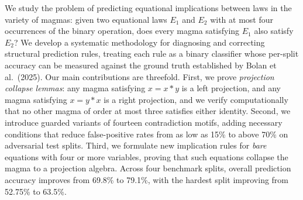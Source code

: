 We study the problem of predicting equational implications between laws
in the variety of magmas: given two equational laws $E_1$ and $E_2$
with at most four occurrences of the binary operation, does every magma
satisfying $E_1$ also satisfy $E_2$?  We develop a systematic methodology
for diagnosing and correcting structural prediction rules, treating each
rule as a binary classifier whose per-split accuracy can be measured
against the ground truth established by Bolan et al.\ (2025).
Our main contributions are threefold.  First, we prove \emph{projection
collapse lemmas}: any magma satisfying $x = x * y$ is a left projection,
and any magma satisfying $x = y * x$ is a right projection, and we
verify computationally that no other magma of order at most three
satisfies either identity.  Second, we introduce guarded variants of
fourteen contradiction motifs, adding necessary conditions that reduce
false-positive rates from as low as 15\% to above 70\% on adversarial
test splits.  Third, we formulate new implication rules for
\emph{bare} equations with four or more variables, proving that such
equations collapse the magma to a projection algebra.  Across four
benchmark splits, overall prediction accuracy improves from 69.8\% to
79.1\%, with the hardest split improving from 52.75\% to 63.5\%.
